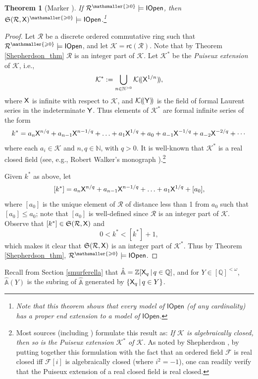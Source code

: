 \documentclass{amsart}
\renewcommand{\leq}{\leqslant}
\renewcommand{\geq}{\geqslant}
\newtheorem{theorem}{Theorem}[section]
\newcommand{\mc}[1]{\mathcal #1}
\newcommand{\X}{{\sf X}}
\newcommand{\Y}{{\sf Y}}
\newcommand{\shef}{\mathfrak{S}}
\newcommand{\fsvar}{Y}
\begin{document}
\begin{theorem}[Marker \cite{markerIOpen}] \label{Marker_thm}
    If $\mc R^{\mathsmaller{\geq 0}}\models {\sf IOpen}$, then $\shef(\mc R,\X)^{\mathsmaller{\geq 0}}\models {\sf IOpen}$.\footnote{Note that this theorem shows that every model of $\mathsf{IOpen}$ (of any cardinality) has a proper end extension to a model of $\mathsf{IOpen}$.}
\end{theorem}
\begin{proof}
  Let $\mc R$ be a discrete ordered commutative ring such that $\mc R^{\mathsmaller{\geq 0}}\models {\sf IOpen}$, and let $\mc K=\mathsf{rc}(\mc R)$. Note that by Theorem \ref{Shepherdson_thm} $\mc R$ is an integer part of $\mc K$. Let $\mc K^{*}$ be the \emph{Puiseux extension} of $\mc K$, i.e., 
 $$\mc K^{*}:= 
\bigcup\limits_{n\in \mathbb{N}^{>0}}\mc K(\!(\X^{1/n})\!),$$
where $\X$ is infinite with respect to $\mc K$, and $\mc K(\!(\Y)\!)$ is the field of formal Laurent series in the indeterminate $\Y$. Thus elements of $\mc K^{*}$ are formal infinite series of the form 
\[k^{*}=a_n\X^{n/q}+a_{n-1}\X^{n-1/q} + \ldots + a_1 \X^{1/q} + a_0 + a_{-1}\X^{-1/q}+a_{-2}\X^{-2/q}+\cdots\]
    where each $a_i\in \mc K$ and $n,q\in \mathbb{N}$, with $q>0$. It is well-known that $\mc K^{*}$ is a real closed field (see, e.g., Robert Walker's monograph \cite{Walker1978}).\footnote{Most sources (including \cite{Walker1978}) formulate this result as: \emph{If $\mc K$ is algebraically closed, then so is the Puiseux extension $\mc K^{*}$ of $\mc K$.} As noted by Shepherdson \cite{shep:nons64}, by putting together this formulation with the fact that an ordered field $\mc F$ is real closed iff $\mc F[i]$ is algebraically closed (where $i^2=-1$), one can readily verify that the Puiseux extension of a real closed field is real closed.}
    
    Given $k^*$ as above, let  \[[k^{*}]=a_n\X^{n/q}+a_{n-1}\X^{n-1/q} + \ldots + a_1 \X^{1/q} + [a_0],\] where $[a_0]$ is the unique element of $\mc R$ of distance less than 1 from $a_0$ such that $[a_0]\leq a_0$; note that $[a_0]$ is well-defined since $\mc R$ is an integer part of $\mc K$. 
        Observe that $[k^{*}]\in \shef (\mc R,\X)$ and $$0< k^*<[k^*]+1,$$ which makes it clear that $\shef (\mc R,\X)$ is an integer part of $\mc K^{*}$. Thus by Theorem \ref{Shepherdson_thm}, $\mc R^{\mathsmaller{\geq 0}}\models {\sf IOpen}$. 
\end{proof}
%
Recall from Section \ref{smurferella} that $\hat{\mathbb{A}}= \mathbb{Z}[\X_{q}\mathop\mid q\in \mathbb{Q}]$, and for $\fsvar \in [\mathbb{Q}]^{<\omega}$, $\hat{\mathbb{A}}(\fsvar)$ is the subring of $\hat{\mathbb{A}}$ generated by $\{\X_q \mathop\mid q\in \fsvar\}$.
\end{document}
